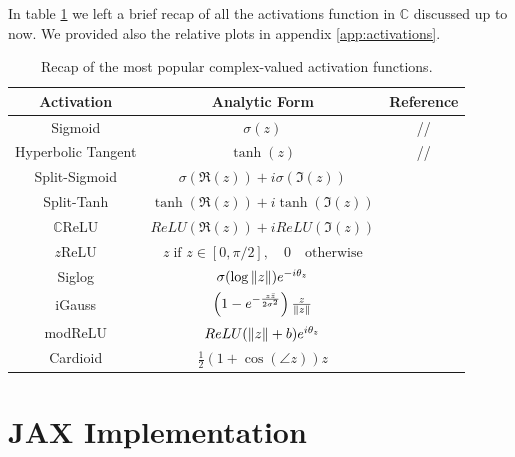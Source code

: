 \documentclass[../main.tex]{subfiles}
\begin{document}
In table \ref{tab:cmplx_activations} we left a brief recap of all the activations function in $\mathds{C}$ discussed up to now. We provided also the relative plots in appendix \ref{app:activations}.

\begin{table}[!ht]
\centering
\begin{tabular}{c c c}
\toprule
\textbf{Activation} & \textbf{Analytic Form} & \textbf{Reference}\\
\midrule
Sigmoid & $\sigma(z)$ & // \\
Hyperbolic Tangent & $\tanh(z)$ & // \\
Split-Sigmoid & $\sigma(\Re(z)) + i\sigma(\Im(z))$ & \cite{Nitta_complexBP}\\
Split-Tanh & $\tanh(\Re(z)) + i\tanh(\Im(z))$ & \cite{Nitta_complexBP}\\
$\mathds{C}$ReLU & $ReLU(\Re(z)) + iReLU(\Im(z))$ & \cite{trabelsi2018deep} \\
$z$ReLU & $z\;\text{if } z\in[0,\pi/2],\quad0\quad\text{otherwise}$ & \cite{guberman2016complex} \\
Siglog & $\sigma(\log\norm{z})e^{-i\theta_z}$ & \cite{Koutsougeras_siglog} \\
iGauss & $\left(1-e^{-\frac{z\bar{z}}{2\sigma^2}}\right)\frac{z}{\norm{z}}$ & \cite{Virtue:EECS-2019-126}\\
modReLU & $ReLU(\norm{z} + b)e^{i\theta_z}$ & \cite{DBLP:journals/corr/ArjovskySB15} \\
Cardioid & $\frac{1}{2}\left(1 + \cos(\angle z)\right)z$ & \cite{Virtue:EECS-2019-126}\\
\bottomrule
\end{tabular}
\caption{Recap of the most popular complex-valued activation functions.}
\label{tab:cmplx_activations}
\end{table}



\section{JAX Implementation}
\end{document}
